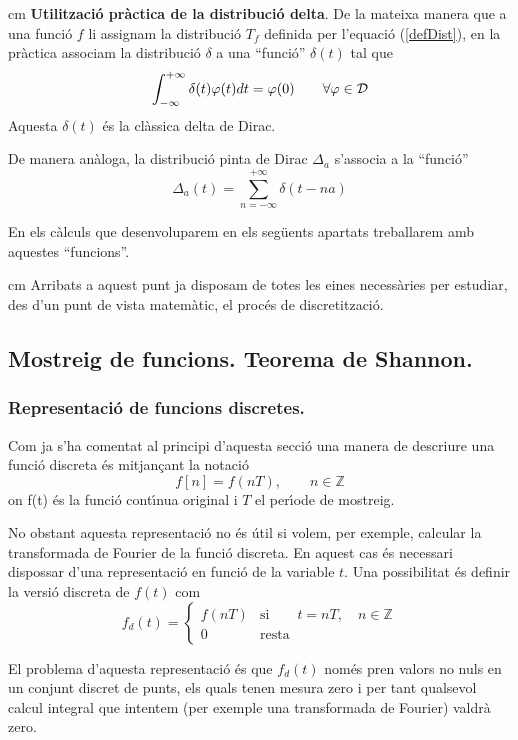 \documentclass{article}
\def\Z{\mathbb Z}
\begin{document}
 cm
\noindent
\textbf{Utilitzaci\'o pr\`actica de la distribuci\'o delta}.
De la mateixa manera que a una funci\'o $f$ li assignam la distribuci\'o
$T_f$ definida per l'equaci\'o (\ref{defDist}), en la pr\`actica associam
la distribuci\'o $\delta$ a una ``funci\'o'' $\delta(t)$ tal que 
\[
\int_{-\infty}^{+\infty} \delta(t) \varphi(t) dt = \varphi(0) \qquad 
\forall \varphi \in {\cal D}
\]
\noindent 
Aquesta $\delta(t)$ \'es la cl\`assica delta de Dirac.

De manera an\`aloga, la distribuci\'o pinta de Dirac $\Delta_a$ s'associa
a la ``funci\'o'' 
\[
\Delta_a(t)=\sum_{n=-\infty}^{+\infty} \delta(t-na)
\]

En els c\`alculs que desenvoluparem en els seg\"uents apartats
treballarem amb aquestes ``funcions''.

 cm
Arribats a aquest punt ja disposam de totes les eines necess\`aries 
per estudiar, des d'un punt de vista matem\`atic, el proc\'es de
discretitzaci\'o.
\subsection{Mostreig de funcions. Teorema de Shannon.}
\label{mostreig}
\subsubsection{Representaci\'o de funcions discretes.}
Com ja s'ha comentat al principi d'aquesta secci\'o una manera de 
descriure una funci\'o discreta \'es mitjan\c{c}ant la notaci\'o
\[
f[n]=f(nT), \qquad n \in \Z
\]
\noindent
on f(t) \'es la funci\'o cont\'\i nua original i $T$ el per\'\i ode de
mostreig.

No obstant aquesta representaci\'o no \'es \'util si volem, per exemple,
calcular la transformada de Fourier de la funci\'o discreta. En aquest cas
\'es necessari dispossar d'una representaci\'o en funci\'o de la variable
$t$. Una possibilitat \'es definir la versi\'o discreta de $f(t)$ com
\[
f_d(t)=\begin{cases}
f(nT) & \mathrm{si} \qquad t=nT, \quad n \in \Z\\
0    & \mathrm{resta}
\end{cases}
\]

El problema d'aquesta representaci\'o \'es que $f_d(t)$ nom\'es pren
valors no nuls en un conjunt discret de punts, els quals tenen mesura
zero i per tant qualsevol calcul integral que intentem (per exemple
una transformada de Fourier) valdr\`a zero.
\end{document}
